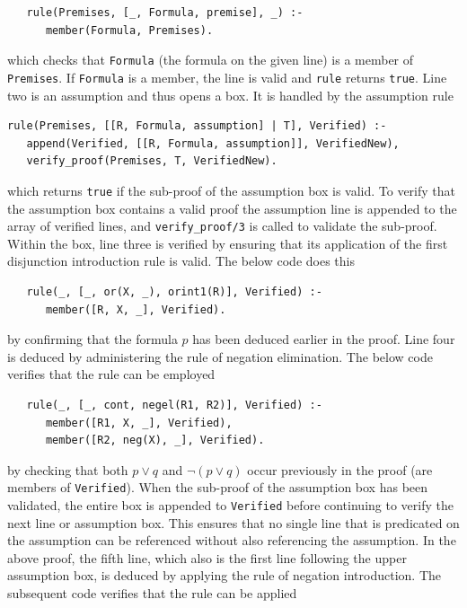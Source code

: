 \documentclass[a4paper, 11pt]{article}
\begin{document}
\begin{enumerate}
\begin{verbatim}
   rule(Premises, [_, Formula, premise], _) :-
      member(Formula, Premises).
\end{verbatim}
                    
            which checks that \texttt{Formula} (the formula
            on the given line) is a member of
            \texttt{Premises}. If \texttt{Formula} is a
            member, the line is valid and \texttt{rule} returns
            \texttt{true}. Line two is an assumption and thus 
            opens a box. It is handled by the assumption rule

\begin{verbatim}
rule(Premises, [[R, Formula, assumption] | T], Verified) :-
   append(Verified, [[R, Formula, assumption]], VerifiedNew),
   verify_proof(Premises, T, VerifiedNew).
\end{verbatim}

            which returns \texttt{true} if the sub-proof of the
            assumption box is valid. To verify that the
            assumption box contains a valid proof the
            assumption line is appended to the array of
            verified lines, and \texttt{verify\_proof/3} is
            called to validate the sub-proof. Within the box,
            line three is verified by ensuring that its
            application of the first disjunction introduction
            rule is valid. The below code does this

\begin{verbatim}
   rule(_, [_, or(X, _), orint1(R)], Verified) :-
      member([R, X, _], Verified).
\end{verbatim}

            by confirming that the formula $p$ has been
            deduced earlier in the proof. Line four is deduced
            by administering the rule of negation elimination.
            The below code verifies that the rule can be
            employed

\begin{verbatim}
   rule(_, [_, cont, negel(R1, R2)], Verified) :-
      member([R1, X, _], Verified),
      member([R2, neg(X), _], Verified).
\end{verbatim}

            by checking that both $p \vee q$ and 
            $\neg(p \vee q)$ occur previously in the proof
            (are members of \texttt{Verified}). When the
            sub-proof of the assumption box has been
            validated, the entire box is appended to
            \texttt{Verified} before continuing to verify the
            next line or assumption box. This ensures that no
            single line that is predicated on the assumption
            can be referenced without also referencing the
            assumption. In the above proof, the fifth line, 
            which also is the first line following the
            upper assumption box, is deduced by applying the
            rule of negation introduction. The subsequent code
            verifies that the rule can be applied


\end{enumerate}
\end{document}

